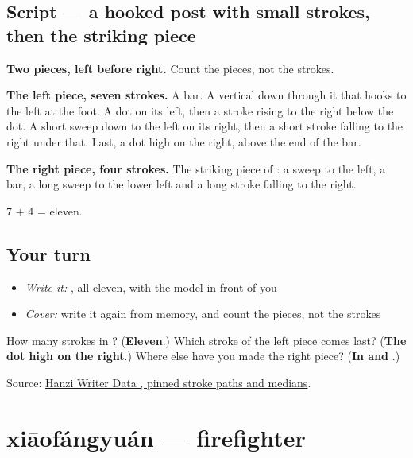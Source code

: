 \subsection*{Script — a hooked post with small strokes, then the striking piece}

\begin{quote}
\end{quote}

\textbf{Two pieces, left before right.} Count the pieces, not the strokes.

\textbf{The left piece, seven strokes.} A bar. A vertical down through it that hooks to the left at the foot. A dot on its left, then a stroke rising to the right below the dot. A short sweep down to the left on its right, then a short stroke falling to the right under that. Last, a dot high on the right, above the end of the bar.

\textbf{The right piece, four strokes.} The striking piece of : a sweep to the left, a bar, a long sweep to the lower left and a long stroke falling to the right.

7 + 4 = eleven.

\subsection*{Your turn}
\begin{itemize}
\raggedright
  \item \emph{Write it:} , all eleven, with the model in front of you
  \item \emph{Cover:} write it again from memory, and count the pieces, not the strokes
\end{itemize}

\begin{tcolorbox}[breakable,colback=teal!4,colframe=teal!35!black,title={Before you move on}]
How many strokes in ? (\textbf{Eleven}.) Which stroke of the left piece comes last? (\textbf{The dot high on the right}.) Where else have you made the right piece? (\textbf{In  and }.)

Source: \href{https://raw.githubusercontent.com/chanind/hanzi-writer-data/68d10a4b21150cae5e1ebbd223eed289cf32d90c/data/\%E6\%95\%91.json}{Hanzi Writer Data , pinned stroke paths and medians}.
\end{tcolorbox}
\section[xiāofángyuán]{xiāofángyuán — firefighter}

